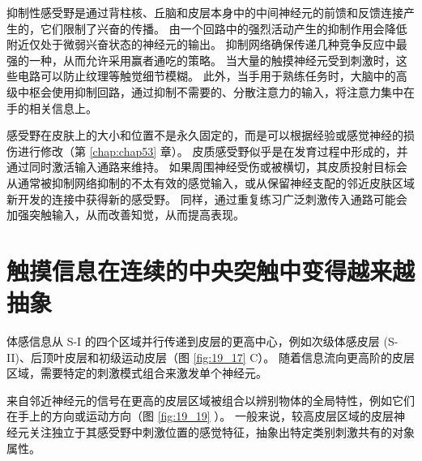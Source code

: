 抑制性感受野是通过背柱核、丘脑和皮层本身中的中间神经元的前馈和反馈连接产生的，它们限制了兴奋的传播。 
由一个回路中的强烈活动产生的抑制作用会降低附近仅处于微弱兴奋状态的神经元的输出。 
抑制网络确保传递几种竞争反应中最强的一种，从而允许采用赢者通吃的策略。 
当大量的触摸神经元受到刺激时，这些电路可以防止纹理等触觉细节模糊。 
此外，当手用于熟练任务时，大脑中的高级中枢会使用抑制回路，通过抑制不需要的、分散注意力的输入，将注意力集中在手的相关信息上。


感受野在皮肤上的大小和位置不是永久固定的，而是可以根据经验或感觉神经的损伤进行修改（第 \ref{chap:chap53} 章）。 
皮质感受野似乎是在发育过程中形成的，并通过同时激活输入通路来维持。 
如果周围神经受伤或被横切，其皮质投射目标会从通常被抑制网络抑制的不太有效的感觉输入，或从保留神经支配的邻近皮肤区域新开发的连接中获得新的感受野。 
同样，通过重复练习广泛刺激传入通路可能会加强突触输入，从而改善知觉，从而提高表现。



\section{触摸信息在连续的中央突触中变得越来越抽象}
体感信息从 S-I 的四个区域并行传递到皮层的更高中心，例如次级体感皮层 (S-II)、后顶叶皮层和初级运动皮层（图 \ref{fig:19_17} C）。 
随着信息流向更高阶的皮层区域，需要特定的刺激模式组合来激发单个神经元。


来自邻近神经元的信号在更高的皮层区域被组合以辨别物体的全局特性，例如它们在手上的方向或运动方向（图 \ref{fig:19_19} ）。 
一般来说，较高皮层区域的皮层神经元关注独立于其感受野中刺激位置的感觉特征，抽象出特定类别刺激共有的对象属性。

